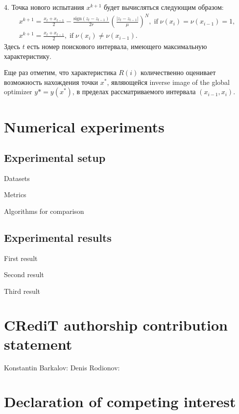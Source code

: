 \documentclass[preprint,12pt]{elsarticle}
\begin{document}
4. Точка нового испытания $x^{k+1}$ будет вычисляться следующим образом:
\begin{gather}\label{xk1_int}
x^{k+1} = \frac{x_t+x_{t-1}}{2}- \frac{\mathrm{sign}(z_t-z_{t-1})}{2r} \left(\frac{\left|z_t-z_{t-1}\right|}{\mu}\right)^N, \; \mathrm{if} \; \nu(x_i) = \nu(x_{i-1}) = 1, \nonumber \\    
x^{k+1} = \frac{x_t+x_{t-1}}{2} , \; \mathrm{if} \; \nu(x_i) \neq \nu(x_{i-1}). \nonumber
\end{gather}
Здесь $t$ есть номер поискового интервала, имеющего максимальную характеристику.

Еще раз отметим, что характеристика $R(i)$ количественно оценивает возможность нахождения точки $x^*$, являющейся inverse image of the global optimizer $y* = y(x^*)$, в пределах рассматриваемого интервала $(x_{i-1},x_i)$.

\section{Numerical experiments}
\label{sec_exp}

\subsection{Experimental setup}

Datasets

Metrics

Algorithms for comparison

\subsection{Experimental results}

First result

Second result 

Third result





\section*{CRediT authorship contribution statement}

Konstantin Barkalov:
Denis Rodionov: 


\section*{Declaration of competing interest}
\end{document}
